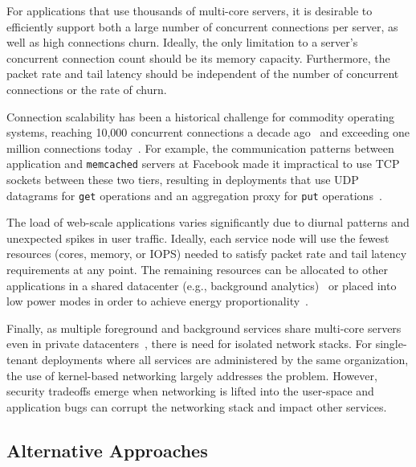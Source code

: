  For applications that use
thousands of multi-core servers, it is desirable to efficiently
support both a large number of concurrent connections per server, as
well as high connections churn.  Ideally, the only limitation to a
server's concurrent connection count should be its memory
capacity. Furthermore, the packet rate and tail latency should be
independent of the number of concurrent connections or the rate of
churn.
 
Connection scalability has been a historical challenge for commodity
operating systems, reaching 10,000 concurrent connections a decade
ago~\cite{theC10Kproblem} and exceeding one million connections
today~\cite{theC10Mproblem}.  For example, the communication patterns
between application and \texttt{memcached} servers at Facebook made it
impractical to use TCP sockets between these two tiers, resulting in
deployments that use UDP datagrams for \texttt{get} operations and an
aggregation proxy for \texttt{put}
operations~\cite{DBLP:conf/nsdi/NishtalaFGKLLMPPSSTV13}.

 The load of web-scale applications
varies significantly due to diurnal patterns and unexpected spikes in
user traffic. Ideally, each service node will use the fewest
resources (cores, memory, or IOPS) needed to satisfy packet rate
and tail latency requirements at any point. The remaining
resources can be allocated to other applications in a shared
datacenter (e.g., background
analytics)~\cite{DBLP:conf/asplos/DelimitrouK14,Hindman:2011:MPF,DBLP:conf/eurosys/LeverichK14}
or placed into low power modes in order to achieve energy
proportionality~\cite{DBLP:journals/computer/BarrosoH07, DBLP:conf/isca/LoCGBK14}.

 Finally, as multiple foreground and
background services share multi-core servers even in private
datacenters~\cite{DBLP:journals/cacm/DeanB13,Hindman:2011:MPF,Schwarzkopf:2013:OFS},
there is need for isolated network stacks. For single-tenant
deployments where all services are administered by the same
organization, the use of kernel-based networking largely addresses the
problem.  However, security tradeoffs emerge when networking is lifted
into the user-space and application bugs can corrupt the networking
stack and impact other services.


\subsection{Alternative Approaches}
\label{sec:motivation:current}


